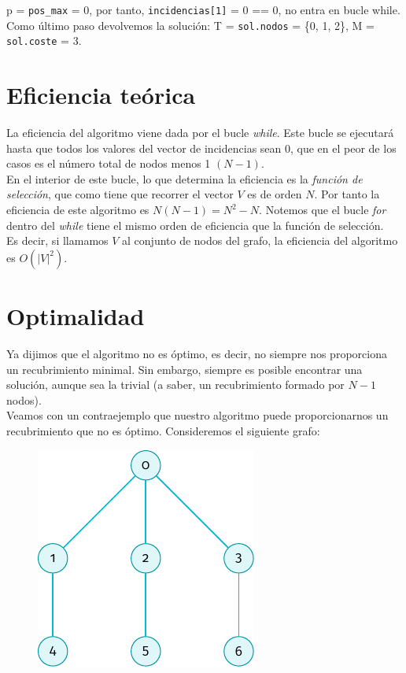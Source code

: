 \documentclass[11pt]{article}
\begin{document}
 p = \verb|pos_max| = 0, por tanto, \verb|incidencias[1]| = 0 == 0, no entra en bucle while. Como último paso devolvemos la solución:  T  = \verb|sol.nodos| = \{0, 1, 2\}, M = \verb|sol.coste| = 3.
 
\section*{Eficiencia teórica}
La eficiencia del algoritmo viene dada por el bucle \textit{while}. Este bucle se ejecutará hasta que todos los valores del vector de incidencias sean $0$, que en el peor de los casos es el número total de nodos menos 1 $(N - 1)$.\\

En el interior de este bucle, lo que determina la eficiencia es la \textit{función de selección}, que como tiene que recorrer el vector $V$ es de orden $N$. Por tanto la eficiencia de este algoritmo es $N(N-1) = N^2 - N$. Notemos que el bucle \textit{for} dentro del \textit{while} tiene el mismo orden de eficiencia que la función de selección.\\

Es decir, si llamamos $V$ al conjunto de nodos del grafo, la eficiencia del algoritmo es $O(|V|^2)$.

\section*{Optimalidad}

Ya dijimos que el algoritmo no es óptimo, es decir, no siempre nos proporciona un recubrimiento minimal. Sin embargo, siempre es posible encontrar una solución, aunque sea la trivial (a saber, un recubrimiento formado por $N-1$ nodos).\\

Veamos con un contraejemplo que nuestro algoritmo puede proporcionarnos un recubrimiento que no es óptimo. Consideremos el siguiente grafo:

\begin{figure}[H]
	\centering \includegraphics{./img/grafo2.pdf}
\end{figure}
\end{document}
